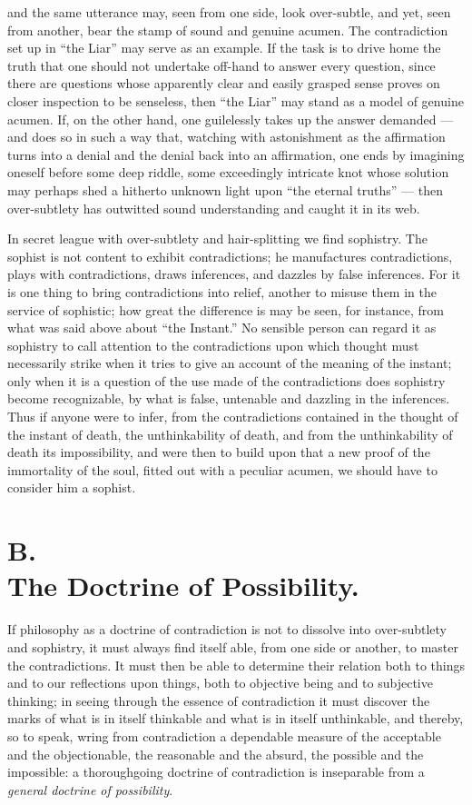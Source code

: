 \documentclass[12pt,a4paper]{book}
\begin{document}
and the same utterance may, seen from one side, look over-subtle, and yet, seen
from another, bear the stamp of sound and genuine acumen. The contradiction set
up in ``the Liar'' may serve as an example. If the task is to drive home the
truth that one should not undertake off-hand to answer every question, since
there are questions whose apparently clear and easily grasped sense proves on
closer inspection to be senseless, then ``the Liar'' may stand as a model of
genuine acumen. If, on the other hand, one guilelessly takes up the answer
demanded --- and does so in such a way that, watching with astonishment as the
affirmation turns into a denial and the denial back into an affirmation, one
ends by imagining oneself before some deep riddle, some exceedingly intricate
knot whose solution may perhaps shed a hitherto unknown light upon ``the
eternal truths'' --- then over-subtlety has outwitted sound understanding and
caught it in its web.

In secret league with over-subtlety and hair-splitting we find sophistry. The
sophist is not content to exhibit contradictions; he manufactures
contradictions, plays with contradictions, draws inferences, and dazzles by
false inferences. For it is one thing to bring contradictions into relief,
another to misuse them in the service of sophistic; how great the difference is
may be seen, for instance, from what was said above about ``the Instant.'' No
sensible person can regard it
as sophistry to call attention to the contradictions upon which thought must
necessarily strike when it tries to give an account of the meaning of the
instant; only when it is a question of the use made of the
contradictions does sophistry become recognizable, by what is false, untenable
and dazzling in the inferences. Thus if anyone were to infer, from the
contradictions contained in the thought of the instant of death, the
unthinkability of death, and from the unthinkability of death its
impossibility, and were then to build upon that a new proof of the immortality
of the soul, fitted out with a peculiar acumen, we should have to consider him
a sophist.

\section*{B.\\ The Doctrine of Possibility.}

If philosophy as a doctrine of contradiction is not to dissolve into
over-subtlety and sophistry, it must always find itself able, from one side or
another, to master the contradictions. It must then be able to determine their
relation both to things and to our reflections upon things, both to objective
being and to subjective thinking; in seeing through the essence of
contradiction it must discover the marks of what is in itself thinkable and
what is in itself unthinkable, and thereby, so to speak, wring from
contradiction a dependable measure of the acceptable and the objectionable, the
reasonable and the absurd, the possible and the impossible: a thoroughgoing
doctrine of contradiction is inseparable from a \emph{general doctrine of
possibility}.
\end{document}
